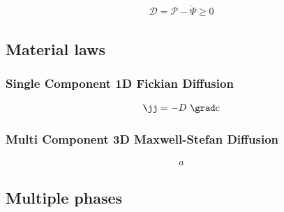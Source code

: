 \begin{align}
  \mathcal{D} = \mathcal{P} - \dot \Psi \geq 0
\end{align}

\subsection{Material laws}
\subsubsection{Single Component 1D Fickian Diffusion}
\begin{align}
  \jj = -D \ \grad c 
\end{align}
\subsubsection{Multi Component 3D Maxwell-Stefan Diffusion}
  \begin{align}
    a
  \end{align}
\subsection{Multiple phases}
